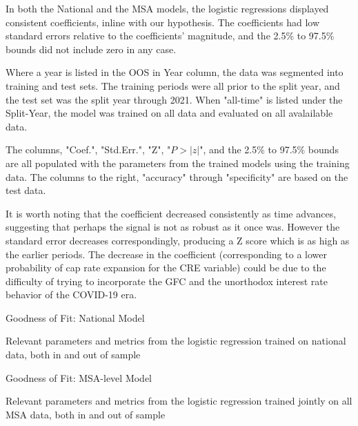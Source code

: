 In both the National and the MSA models, the logistic regressions displayed consistent coefficients, inline with our hypothesis. The coefficients had low standard errors relative  to the coefficients' magnitude, and the 2.5\% to 97.5\% bounds did not include zero in any case. 

Where a year is listed in the OOS in Year column, the data was segmented into training and test sets. The training periods were all prior to the split year, and the test set was the split year through 2021. When "all-time" is listed under the Split-Year, the model was trained on all data and evaluated on all avalailable data. 

The columns, "Coef.", "Std.Err.", "Z", "$P>|z|$", and the 2.5\% to 97.5\% bounds are all populated with the parameters from the trained models using the training data. The columns to the right, "accuracy" through "specificity" are based on the test data. 

It is worth noting that the coefficient decreased consistently as time advances, suggesting that perhaps the signal is not as robust as it once was. However the standard error decreases correspondingly, producing a Z score which is as high as the earlier periods. The decrease in the coefficient (corresponding to a lower probability of cap rate expansion for the CRE variable) could be due to the difficulty of trying to incorporate the GFC and the unorthodox interest rate behavior of the COVID-19 era. 

\begin{table}[H]
\centering
\caption*{Goodness of Fit: National Model}
\centering
\caption{Relevant parameters and metrics from the logistic regression trained on national data, both in and out of sample}
\end{table}

\begin{table}[H]
\centering
\caption*{Goodness of Fit: MSA-level Model}
\caption{Relevant parameters and metrics from the logistic regression trained jointly on all MSA data, both in and out of sample}
\end{table}



